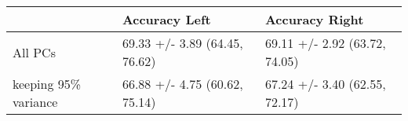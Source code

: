 \begin{tabular}{lll}
\toprule
{} &                  Accuracy Left &                 Accuracy Right \\
\midrule
All PCs              &  69.33 +/- 3.89 (64.45, 76.62) &  69.11 +/- 2.92 (63.72, 74.05) \\
keeping 95\% variance &  66.88 +/- 4.75 (60.62, 75.14) &  67.24 +/- 3.40 (62.55, 72.17) \\
\bottomrule
\end{tabular}
